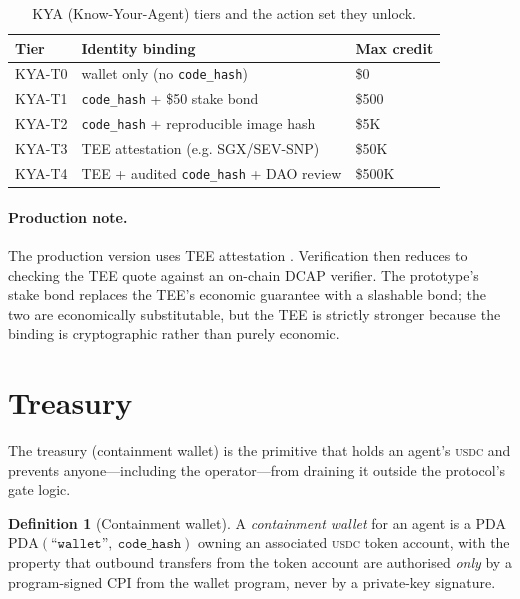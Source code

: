 \documentclass[10pt,conference,letterpaper]{IEEEtran}
\theoremstyle{definition}
\newtheorem{definition}[theorem]{Definition}
\newcommand{\codehash}{\texttt{code\_hash}}
\newcommand{\PDA}[1]{\ensuremath{\mathrm{PDA}(#1)}}
\newcommand{\USDC}{\textsc{usdc}}
\begin{document}
\begin{table}[t]
\caption{KYA (Know-Your-Agent) tiers and the action set they unlock.}
\label{tab:kya}
\centering
\small
\begin{tabularx}{\columnwidth}{lXl}
\toprule
\textbf{Tier} & \textbf{Identity binding} & \textbf{Max credit} \\
\midrule
KYA-T0 & wallet only (no \codehash)               & \$0 \\
KYA-T1 & \codehash{} + \$50 stake bond            & \$500 \\
KYA-T2 & \codehash{} + reproducible image hash    & \$5K \\
KYA-T3 & TEE attestation (e.g. SGX/SEV-SNP)       & \$50K \\
KYA-T4 & TEE + audited \codehash{} + DAO review   & \$500K \\
\bottomrule
\end{tabularx}
\end{table}

\paragraph{Production note.} The production version uses TEE
attestation \cite{costan2016intel,dcap2024onchain}. Verification then
reduces to checking the TEE quote against an on-chain DCAP verifier.
The prototype's stake bond replaces the TEE's economic guarantee with a
slashable bond; the two are economically substitutable, but the TEE is
strictly stronger because the binding is cryptographic rather than
purely economic.

\section{Treasury}\label{sec:treasury}

The treasury (containment wallet) is the primitive that holds an
agent's \USDC{} and prevents anyone---including the operator---from
draining it outside the protocol's gate logic.

\begin{definition}[Containment wallet]\label{def:wallet}
A \emph{containment wallet} for an agent is a PDA
$\PDA{\texttt{``wallet''},\ \codehash}$ owning an associated \USDC{}
token account, with the property that outbound transfers from the
token account are authorised \emph{only} by a program-signed CPI from
the wallet program, never by a private-key signature.
\end{definition}
\end{document}
